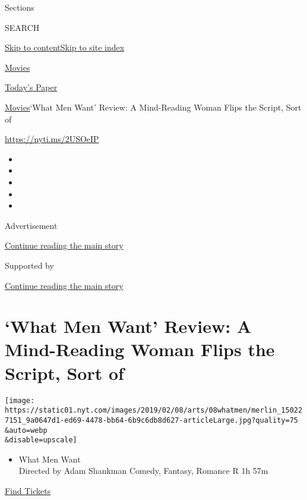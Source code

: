 Sections

SEARCH

\protect\hyperlink{site-content}{Skip to
content}\protect\hyperlink{site-index}{Skip to site index}

\href{https://www.nytimes.com/section/movies}{Movies}

\href{https://myaccount.nytimes.com/auth/login?response_type=cookie\&client_id=vi}{}

\href{https://www.nytimes.com/section/todayspaper}{Today's Paper}

\href{/section/movies}{Movies}\textbar{}`What Men Want' Review: A
Mind-Reading Woman Flips the Script, Sort of

\href{https://nyti.ms/2USOeIP}{https://nyti.ms/2USOeIP}

\begin{itemize}
\item
\item
\item
\item
\item
\end{itemize}

Advertisement

\protect\hyperlink{after-top}{Continue reading the main story}

Supported by

\protect\hyperlink{after-sponsor}{Continue reading the main story}

\hypertarget{what-men-want-review-a-mind-reading-woman-flips-the-script-sort-of}{%
\section{`What Men Want' Review: A Mind-Reading Woman Flips the Script,
Sort
of}\label{what-men-want-review-a-mind-reading-woman-flips-the-script-sort-of}}

\texttt{[image: https://static01.nyt.com/images/2019/02/08/arts/08whatmen/merlin\_150227151\_9a0647d1-ed69-4478-bb64-6b9c6db8d627-articleLarge.jpg?quality=75\\\&auto=webp\\\&disable=upscale]}

\begin{itemize}
\tightlist
\item
  What Men Want\\
  Directed by Adam Shankman Comedy, Fantasy, Romance R 1h 57m
\end{itemize}

\href{https://www.imdb.com/showtimes/title/tt7634968?ref_=ref_ext_NYT}{Find
Tickets}


